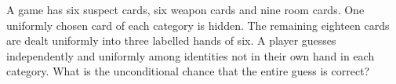 A game has six suspect cards, six weapon cards and nine room cards. One uniformly chosen card of each category is hidden. The remaining eighteen cards are dealt uniformly into three labelled hands of six. A player guesses independently and uniformly among identities not in their own hand in each category. What is the unconditional chance that the entire guess is correct?
